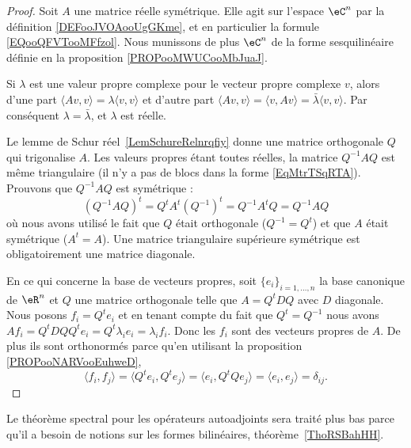 \begin{proof}
    Soit \( A\) une matrice réelle symétrique. Elle agit sur l'espace \( \eC^n\) par la définition \ref{DEFooJVOAooUgGKme}, et en particulier la formule \ref{EQooQFVTooMFfzol}. Nous munissons de plus \( \eC^n\) de la forme sesquilinéaire définie en la proposition \ref{PROPooMWUCooMbJuaJ}. 

    Si \( \lambda\) est une valeur propre complexe pour le vecteur propre complexe \( v\), alors d'une part \( \langle Av, v\rangle =\lambda\langle v, v\rangle \) et d'autre part \( \langle Av, v\rangle =\langle v, Av\rangle =\bar\lambda\langle v, v\rangle \). Par conséquent \( \lambda=\bar\lambda\), et \( \lambda\) est réelle.

    Le lemme de Schur réel~\ref{LemSchureRelnrqfiy} donne une matrice orthogonale \( Q\) qui trigonalise \( A\). Les valeurs propres étant toutes réelles, la matrice \( Q^{-1}AQ\) est même triangulaire (il n'y a pas de blocs dans la forme \eqref{EqMtrTSqRTA}). Prouvons que \( Q^{-1}AQ\) est symétrique :
    \begin{equation}
        (Q^{-1}AQ)^t=Q^tA^t(Q^{-1})^t=Q^{-1}A^tQ=Q^{-1}AQ
    \end{equation}
    où nous avons utilisé le fait que \( Q\) était orthogonale (\( Q^{-1}=Q^t\)) et que \( A\) était symétrique (\( A^t=A\)). Une matrice triangulaire supérieure symétrique est obligatoirement une matrice diagonale.

    En ce qui concerne la base de vecteurs propres, soit \( \{ e_i \}_{i=1,\ldots, n}\) la base canonique de \( \eR^n\) et \( Q\) une matrice orthogonale telle que \( A=Q^tDQ\) avec \( D\) diagonale. Nous posons \( f_i=Q^te_i\) et en tenant compte du fait que \( Q^t=Q^{-1}\) nous avons \( Af_i=Q^tDQQ^te_i=Q^t\lambda_i e_i=\lambda_if_i\). Donc les \( f_i\) sont des vecteurs propres de \( A\). De plus ils sont orthonormés parce qu'en utilisant la proposition \ref{PROPooNARVooEuhweD},
    \begin{equation}
        \langle f_i, f_j\rangle =\langle Q^te_i, Q^te_j\rangle =\langle e_i, Q^tQe_j\rangle =\langle e_i, e_j\rangle =\delta_{ij}.
    \end{equation}
\end{proof}
Le théorème spectral pour les opérateurs autoadjoints sera traité plus bas parce qu'il a besoin de notions sur les formes bilinéaires, théorème~\ref{ThoRSBahHH}.

